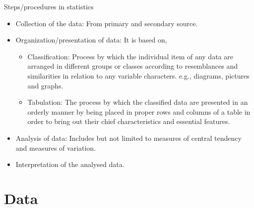 \documentclass[
  ignorenonframetext,
  aspectratio=169]{beamer}
\providecommand{\tightlist}{%
  \setlength{\itemsep}{0pt}\setlength{\parskip}{0pt}}
\begin{document}
\begin{frame}{Steps/procedures in statistics}
\protect\hypertarget{stepsprocedures-in-statistics}{}
\begin{itemize}
\tightlist
\item
  Collection of the data: From primary and secondary source.
\item
  Organization/presentation of data: It is based on,

  \begin{itemize}
  \tightlist
  \item
    Classification: Process by which the individual item of any data are
    arranged in different groups or classes according to resemblances
    and similarities in relation to any variable characters. e.g.,
    diagrams, pictures and graphs.
  \item
    Tabulation: The process by which the classified data are presented
    in an orderly manner by being placed in proper rows and columns of a
    table in order to bring out their chief characteristics and
    essential features.
  \end{itemize}
\item
  Analysis of data: Includes but not limited to measures of central
  tendency and measures of variation.
\item
  Interpretation of the analysed data.
\end{itemize}
\end{frame}

\hypertarget{data}{%
\section{Data}\label{data}}
\end{document}
